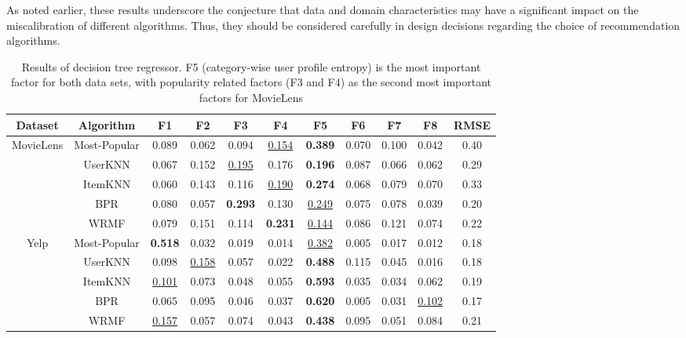 As noted earlier, these results underscore the conjecture that data and domain characteristics may have a significant impact on the miscalibration of different algorithms. Thus, they should be considered carefully in design decisions regarding the choice of recommendation algorithms.  

\begin{table*}[!hbtp]
    \centering
    \begin{tabular}{c c | c c c c c c c c | c} \hline
    Dataset & Algorithm & F1 & F2 & F3 & F4 & F5 & F6 & F7 & F8 & RMSE  \\ \hline
    
    MovieLens & Most-Popular & 0.089 & 0.062 & 0.094 & \underline{0.154} & \textbf{0.389} & 0.070 & 0.100 & 0.042 & 0.40  \\ 
              & UserKNN & 0.067 & 0.152 & \underline{0.195} & 0.176 & \textbf{0.196} & 0.087 & 0.066 & 0.062 & 0.29 \\ 
              & ItemKNN & 0.060 & 0.143 & 0.116 & \underline{0.190} & \textbf{0.274} & 0.068 & 0.079 & 0.070 & 0.33 \\ 
              & BPR     & 0.080 & 0.057 & \textbf{0.293} & 0.130 & \underline{0.249} & 0.075 & 0.078 & 0.039 & 0.20 \\ 
              & WRMF & 0.079 & 0.151 & 0.114 & \textbf{0.231} & \underline{0.144} & 0.086 & 0.121 & 0.074 & 0.22 \\ \hline
              
    Yelp      & Most-Popular & \textbf{0.518} & 0.032 & 0.019 & 0.014 & \underline{0.382} & 0.005 & 0.017 & 0.012 & 0.18  \\ 
              & UserKNN & 0.098 & \underline{0.158} & 0.057 & 0.022 & \textbf{0.488} & 0.115 & 0.045 & 0.016 & 0.18 \\ 
              & ItemKNN & \underline{0.101} & 0.073 & 0.048 & 0.055 & \textbf{0.593} & 0.035 & 0.034 & 0.062 & 0.19 \\ 
              & BPR & 0.065 & 0.095 & 0.046 & 0.037 & \textbf{0.620} & 0.005 & 0.031 & \underline{0.102} & 0.17 \\ 
              & WRMF & \underline{0.157} & 0.057 & 0.074 & 0.043 & \textbf{0.438} & 0.095 & 0.051 & 0.084 & 0.21 \\ \hline
    \end{tabular}
    \caption{Results of decision tree regressor. F5 (category-wise user profile entropy) is the most important factor for both data sets, with popularity related factors (F3 and F4) as the second most important factors for MovieLens}
    \label{tab:factors_importance}
\end{table*}


